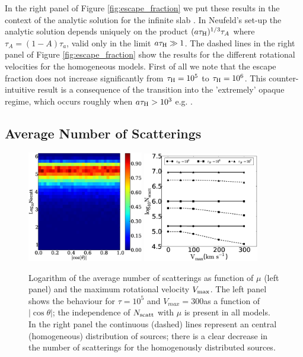 \documentclass{emulateapj}
\newcommand{\kms}{{\ifmmode{{\mathrm{\,km\ s}^{-1}}}\else{\,km~s$^{-1}$}\fi}}
\begin{document}
In the right panel of Figure \ref{fig:escape_fraction} we put these
results in the context of the analytic solution for the infinite slab
\citep{Neufeld90}. In Neufeld's set-up the analytic solution depends
uniquely on the product $(a\tau_{\rm   H})^{1/3}\tau_{A}$ where
$\tau_{A} = (1 - A)\tau_{a}$, valid only in the limit $a\tau_{\rm
  H}\gg 1$. The dashed lines in  the right panel of Figure
\ref{fig:escape_fraction} show the results for the different
rotational velocities for the homogeneous models. First of all we note
that the escape fraction does not increase significantly from
$\tau_{\rm H}=10^{5}$ to $\tau_{\rm H}=10^{6}$. This
counter-intuitive result is a consequence of the transition into the
'extremely' opaque regime,  which occurs roughly when $a\tau_{\rm{H}}
> 10^{3}$  e.g. \citep{Neufeld90}. 


\subsection{Average Number of Scatterings}
\label{sec:scatterings}

\begin{figure}
\begin{center}
    \includegraphics[width=0.45\textwidth]{nscattvsmu.eps}
    \includegraphics[width=0.45\textwidth]{f4.eps}
\end{center}
\caption{Logarithm of the average number of scatterings as function of
  $\mu$ (left panel) and the maximum rotational velocity $V_{\rm
    max}$. The left panel shows the behaviour for $\tau=10^{5}$ and
  $V_{max}=300$\kms as a function of $|\cos\theta|$; the independence of
  $N_{\rm scatt}$ with $\mu$ is present in all models. 
  In the right panel the continuous (dashed) lines represent an
  central (homogeneous) distribution of sources; there is a clear
  decrease in the number of scatterings for the homogenously
  distributed sources. 
\label{fig:Nscatt} }    
\end{figure}
\end{document}
